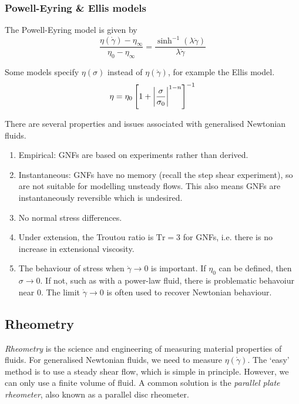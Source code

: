 \documentclass{jknotes}
\newcommand{\srate}{\dot{\gamma}}
\begin{document}
\subsubsection{Powell-Eyring \& Ellis models}
The Powell-Eyring model is given by
\begin{equation}
	\frac{\eta(\srate)-\eta_\infty}{\eta_0 - \eta_\infty} =
	\frac{\sinh^{-1}(\lambda \srate)}{\lambda \srate}
\end{equation}

Some models specify $\eta(\sigma)$ instead of $\eta(\srate)$, for example the
Ellis model.
\begin{equation}
	\eta = \eta_0 \left[ 1 + \abs{\frac{\sigma}{\sigma_0}}^{1-n}\right]^{-1}
\end{equation}

There are several properties and issues associated with generalised Newtonian
fluids.
\begin{enumerate}
	\item Empirical: GNFs are based on experiments rather than derived.
	\item Instantaneous: GNFs have no memory (recall the step shear
		experiment), so are not suitable for modelling unsteady flows. This
		also means GNFs are instantaneously reversible which is undesired.
	\item No normal stress differences.
	\item Under extension, the Troutou ratio is $\text{Tr} = 3$ for GNFs, i.e.
		there is no increase in extensional viscosity.

	\item The behaviour of stress when $\srate \to 0$ is important. If
		$\eta_0$ can be defined, then $\sigma \to 0$. If not, such as with a
		power-law fluid, there is problematic behavoiur near $0$. The limit
		$\srate \to 0$ is often used to recover Newtonian behaviour.
\end{enumerate}

\subsection{Rheometry}
\emph{Rheometry} is the science and engineering of measuring material
properties of fluids. For generalised Newtonian fluids, we need to measure
$\eta(\srate)$. The `easy' method is to use a steady shear flow, which is
simple in principle. However, we can only use a finite volume of fluid. A
common solution is the \emph{parallel plate rheometer}, also known as a
parallel disc rheometer. 
\end{document}
